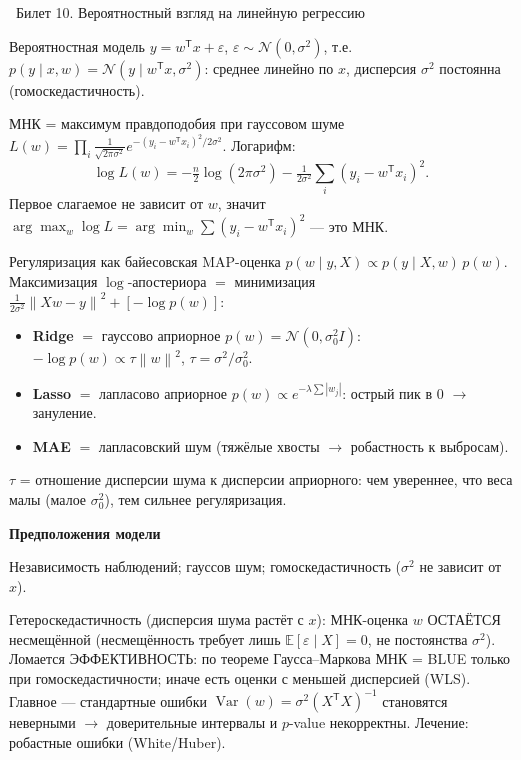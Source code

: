 \documentclass[12pt, a4paper]{article}
\newcommand{\bilet}[2]{%
  \vspace{10pt}%
  \noindent\colorbox{qcolor}{\parbox{\dimexpr\linewidth-2\fboxsep\relax}{%
    \color{white}\large\bfseries\strut\ Билет #1. #2%
  }}%
  \nopagebreak\vspace{5pt}\par\nopagebreak%
}
\newcommand{\qsub}[1]{%
  \vspace{5pt}%
  {\bfseries\color{defblue} #1}%
  \par\vspace{2pt}%
}
\newcommand{\E}{\mathbb{E}}
\newcommand{\Var}{\operatorname{Var}}
\newcommand{\tr}{^{\mathsf{T}}}
\newcommand{\norm}[1]{\left\lVert #1 \right\rVert}
\begin{document}
\bilet{10}{Вероятностный взгляд на линейную регрессию}

\begin{defbox}{Вероятностная модель}
$y = w\tr x + \varepsilon$, $\varepsilon \sim \mathcal{N}(0, \sigma^2)$, т.е.\ $p(y\mid x, w) = \mathcal{N}(y \mid w\tr x, \sigma^2)$: среднее линейно по $x$, дисперсия $\sigma^2$ постоянна (гомоскедастичность).
\end{defbox}

\begin{proofbox}{МНК = максимум правдоподобия при гауссовом шуме}
$L(w) = \prod_i \frac{1}{\sqrt{2\pi\sigma^2}} e^{-(y_i - w\tr x_i)^2/2\sigma^2}$. Логарифм:
\[
  \log L(w) = -\tfrac{n}{2}\log(2\pi\sigma^2) - \tfrac{1}{2\sigma^2}\sum_i (y_i - w\tr x_i)^2.
\]
Первое слагаемое не зависит от $w$, значит $\arg\max_w \log L = \arg\min_w \sum(y_i - w\tr x_i)^2$ --- это МНК.
\end{proofbox}

\begin{propbox}{Регуляризация как байесовская MAP-оценка}
$p(w \mid y, X) \propto p(y \mid X, w)\, p(w)$. Максимизация $\log$-апостериора $= $ минимизация $\frac{1}{2\sigma^2}\norm{Xw - y}^2 + [-\log p(w)]$:
\begin{itemize}
  \item \textbf{Ridge} $=$ гауссово априорное $p(w) = \mathcal{N}(0, \sigma_0^2 I)$: $-\log p(w) \propto \tau\norm{w}^2$, $\tau = \sigma^2/\sigma_0^2$.
  \item \textbf{Lasso} $=$ лапласово априорное $p(w) \propto e^{-\lambda\sum|w_j|}$: острый пик в 0 $\to$ зануление.
  \item \textbf{MAE} $=$ лапласовский шум (тяжёлые хвосты $\to$ робастность к выбросам).
\end{itemize}
$\tau$ = отношение дисперсии шума к дисперсии априорного: чем увереннее, что веса малы (малое $\sigma_0^2$), тем сильнее регуляризация.
\end{propbox}

\qsub{Предположения модели}
Независимость наблюдений; гауссов шум; гомоскедастичность ($\sigma^2$ не зависит от $x$).

\begin{fishkabox}
Гетероскедастичность (дисперсия шума растёт с $x$): МНК-оценка $w$ ОСТАЁТСЯ несмещённой (несмещённость требует лишь $\E[\varepsilon\mid X] = 0$, не постоянства $\sigma^2$). Ломается ЭФФЕКТИВНОСТЬ: по теореме Гаусса--Маркова МНК = BLUE только при гомоскедастичности; иначе есть оценки с меньшей дисперсией (WLS). Главное --- стандартные ошибки $\Var(w) = \sigma^2(X\tr X)^{-1}$ становятся неверными $\to$ доверительные интервалы и $p$-value некорректны. Лечение: робастные ошибки (White/Huber).
\end{fishkabox}
\end{document}
